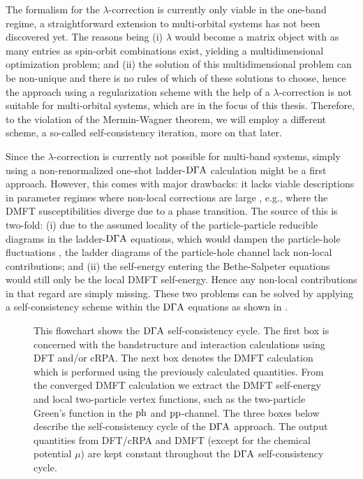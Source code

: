 \documentclass[../../main.tex]{subfiles}
\begin{document}
The formalism for the $\lambda$-correction is currently only viable in the one-band regime, a straightforward extension to multi-orbital systems has not been discovered yet. The reasons being (i) $\lambda$ would become a matrix object with as many entries as spin-orbit combinations exist, yielding a multidimensional optimization problem; and (ii) the solution of this multidimensional problem can be non-unique and there is no rules of which of these solutions to choose, hence the approach using a regularization scheme with the help of a $\lambda$-correction is not suitable for multi-orbital systems, which are in the focus of this thesis. Therefore, to  the violation of the Mermin-Wagner theorem, we will employ a different scheme, a so-called self-consistency iteration, more on that later. 

Since the $\lambda$-correction is currently not possible for multi-band systems, simply using a non-renormalized one-shot ladder-$\text{D}\Gamma\text{A}$ calculation might be a first approach. However, this comes with major drawbacks: it lacks viable descriptions in parameter regimes where non-local corrections are large \cite{sc ladder dga josef}, e.g., where the DMFT susceptibilities diverge due to a phase transition. The source of this is two-fold: (i) due to the assumed locality of the particle-particle reducible diagrams in the ladder-$\text{D}\Gamma\text{A}$ equations, which would dampen the particle-hole fluctuations \cite{rohringer impact of nonlocal}, the ladder diagrams of the particle-hole channel lack non-local contributions; and (ii) the self-energy entering the Bethe-Salpeter equations would still only be the local DMFT self-energy. Hence any non-local contributions in that regard are simply missing. These two problems can be solved by applying a self-consistency scheme within the $\text{D}\Gamma\text{A}$ equations as shown in .
\begin{figure}[ht!]
	\centering
  	
  	\caption{This flowchart shows the $\text{D}\Gamma\text{A}$ self-consistency cycle. The first box is concerned with the bandstructure and interaction calculations using DFT and/or cRPA. The next box denotes the DMFT calculation which is performed using the previously calculated quantities. From the converged DMFT calculation we extract the DMFT self-energy and local two-particle vertex functions, such as the two-particle Green's function in the $\text{ph}$ and $\text{pp}$-channel. The three boxes below describe the self-consistency cycle of the $\text{D}\Gamma\text{A}$ approach. The output quantities from DFT/cRPA and DMFT (except for the chemical potential $\mu$) are kept constant throughout the $\text{D}\Gamma\text{A}$ self-consistency cycle.}
  	\label{fig:flowchart_self_consistency}
\end{figure}
\end{document}

